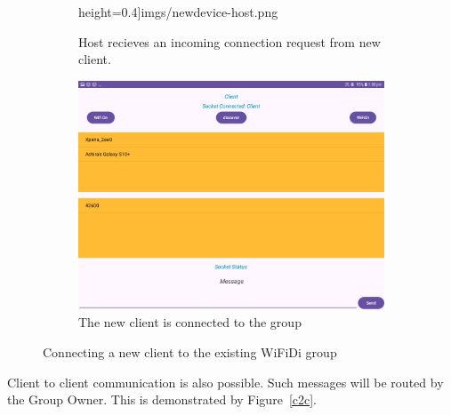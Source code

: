 \begin{figure}
\begin{subfigure}[b]{0.3\textwidth}
            height=0.4\textheight]{imgs/newdevice-host.png}
        \caption{Host recieves an incoming connection request from new client.}
        \label{newClient:request}
    \end{subfigure}
    \hspace{1cm}
    \begin{subfigure}[b]{0.6\textwidth}
        \includegraphics[width=\textwidth,
            height=0.4\textheight]{imgs/newClientConnected.jpg}
        \caption{The new client is connected to the group}
        \label{newClient:connected}
    \end{subfigure}
    \caption{Connecting a new client to the existing WiFiDi group}
    \label{newClient}
\end{figure}

Client to client communication is also possible. Such messages will be routed
by the Group Owner. This is demonstrated by Figure~\ref{c2c}.

